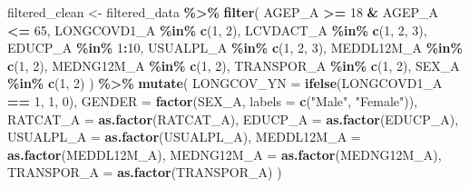 \documentclass[
]{article}
\newenvironment{Shaded}{\begin{snugshade}}{\end{snugshade}}
\newcommand{\AttributeTok}[1]{\textcolor[rgb]{0.13,0.29,0.53}{#1}}
\newcommand{\DecValTok}[1]{\textcolor[rgb]{0.00,0.00,0.81}{#1}}
\newcommand{\FunctionTok}[1]{\textcolor[rgb]{0.13,0.29,0.53}{\textbf{#1}}}
\newcommand{\NormalTok}[1]{#1}
\newcommand{\OtherTok}[1]{\textcolor[rgb]{0.56,0.35,0.01}{#1}}
\newcommand{\SpecialCharTok}[1]{\textcolor[rgb]{0.81,0.36,0.00}{\textbf{#1}}}
\newcommand{\StringTok}[1]{\textcolor[rgb]{0.31,0.60,0.02}{#1}}
\begin{document}
\begin{Shaded}
\begin{Highlighting}[]
\NormalTok{filtered\_clean }\OtherTok{\textless{}{-}}\NormalTok{ filtered\_data }\SpecialCharTok{\%\textgreater{}\%}
  \FunctionTok{filter}\NormalTok{(}
\NormalTok{    AGEP\_A }\SpecialCharTok{\textgreater{}=} \DecValTok{18} \SpecialCharTok{\&}\NormalTok{ AGEP\_A }\SpecialCharTok{\textless{}=} \DecValTok{65}\NormalTok{,}
\NormalTok{    LONGCOVD1\_A }\SpecialCharTok{\%in\%} \FunctionTok{c}\NormalTok{(}\DecValTok{1}\NormalTok{, }\DecValTok{2}\NormalTok{),}
\NormalTok{    LCVDACT\_A }\SpecialCharTok{\%in\%} \FunctionTok{c}\NormalTok{(}\DecValTok{1}\NormalTok{, }\DecValTok{2}\NormalTok{, }\DecValTok{3}\NormalTok{),}
\NormalTok{    EDUCP\_A }\SpecialCharTok{\%in\%} \DecValTok{1}\SpecialCharTok{:}\DecValTok{10}\NormalTok{,}
\NormalTok{    USUALPL\_A }\SpecialCharTok{\%in\%} \FunctionTok{c}\NormalTok{(}\DecValTok{1}\NormalTok{, }\DecValTok{2}\NormalTok{, }\DecValTok{3}\NormalTok{),}
\NormalTok{    MEDDL12M\_A }\SpecialCharTok{\%in\%} \FunctionTok{c}\NormalTok{(}\DecValTok{1}\NormalTok{, }\DecValTok{2}\NormalTok{),}
\NormalTok{    MEDNG12M\_A }\SpecialCharTok{\%in\%} \FunctionTok{c}\NormalTok{(}\DecValTok{1}\NormalTok{, }\DecValTok{2}\NormalTok{),}
\NormalTok{    TRANSPOR\_A }\SpecialCharTok{\%in\%} \FunctionTok{c}\NormalTok{(}\DecValTok{1}\NormalTok{, }\DecValTok{2}\NormalTok{),}
\NormalTok{    SEX\_A }\SpecialCharTok{\%in\%} \FunctionTok{c}\NormalTok{(}\DecValTok{1}\NormalTok{, }\DecValTok{2}\NormalTok{)}
\NormalTok{  ) }\SpecialCharTok{\%\textgreater{}\%}
  \FunctionTok{mutate}\NormalTok{(}
    \AttributeTok{LONGCOV\_YN =} \FunctionTok{ifelse}\NormalTok{(LONGCOVD1\_A }\SpecialCharTok{==} \DecValTok{1}\NormalTok{, }\DecValTok{1}\NormalTok{, }\DecValTok{0}\NormalTok{),}
    \AttributeTok{GENDER =} \FunctionTok{factor}\NormalTok{(SEX\_A, }\AttributeTok{labels =} \FunctionTok{c}\NormalTok{(}\StringTok{"Male"}\NormalTok{, }\StringTok{"Female"}\NormalTok{)),}
    \AttributeTok{RATCAT\_A =} \FunctionTok{as.factor}\NormalTok{(RATCAT\_A),}
    \AttributeTok{EDUCP\_A =} \FunctionTok{as.factor}\NormalTok{(EDUCP\_A),}
    \AttributeTok{USUALPL\_A =} \FunctionTok{as.factor}\NormalTok{(USUALPL\_A),}
    \AttributeTok{MEDDL12M\_A =} \FunctionTok{as.factor}\NormalTok{(MEDDL12M\_A),}
    \AttributeTok{MEDNG12M\_A =} \FunctionTok{as.factor}\NormalTok{(MEDNG12M\_A),}
    \AttributeTok{TRANSPOR\_A =} \FunctionTok{as.factor}\NormalTok{(TRANSPOR\_A)}
\NormalTok{  )}
\end{Highlighting}
\end{Shaded}
\end{document}
